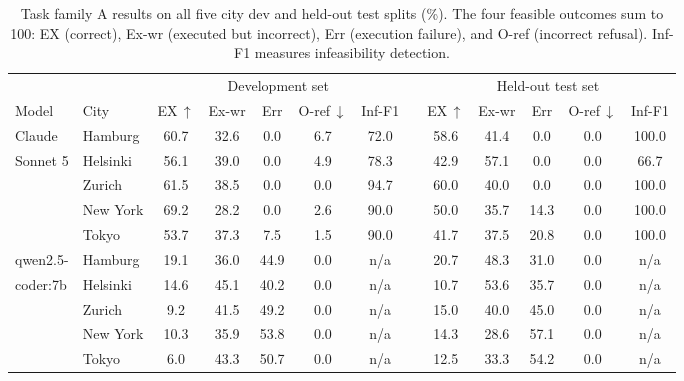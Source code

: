 \documentclass[sigconf,authordraft]{acmart}
\begin{document}
\begin{table}[ht!]
  \caption{
  Task family A results on all five city dev and held-out test splits (\%). The four feasible outcomes sum to 100: EX (correct), Ex-wr (executed but incorrect), Err (execution failure), and O-ref (incorrect refusal). Inf-F1 measures infeasibility detection. 
  }
  \label{tab:results_query}
  \setlength{\tabcolsep}{4pt}
  \begin{tabular}{ll ccccc c ccccc}
    \toprule
    & & \multicolumn{5}{c}{Development set} & & \multicolumn{5}{c}{Held-out test set} \\
    \cmidrule(lr){3-7}\cmidrule(lr){9-13}
    Model & City & EX\,$\uparrow$ & Ex-wr & Err & O-ref\,$\downarrow$ & Inf-F1 & & EX\,$\uparrow$ & Ex-wr & Err & O-ref\,$\downarrow$ & Inf-F1 \\
    \midrule
    Claude   & Hamburg  & 60.7 & 32.6 &  0.0 & 6.7 & 72.0 & & 58.6 & 41.4 &  0.0 & 0.0 & 100.0 \\
    Sonnet 5 & Helsinki & 56.1 & 39.0 &  0.0 & 4.9 & 78.3 & & 42.9 & 57.1 &  0.0 & 0.0 &  66.7 \\
             & Zurich   & 61.5 & 38.5 &  0.0 & 0.0 & 94.7 & & 60.0 & 40.0 &  0.0 & 0.0 & 100.0 \\
             & New York & 69.2 & 28.2 &  0.0 & 2.6 & 90.0 & & 50.0 & 35.7 & 14.3 & 0.0 & 100.0 \\
             & Tokyo    & 53.7 & 37.3 &  7.5 & 1.5 & 90.0 & & 41.7 & 37.5 & 20.8 & 0.0 & 100.0 \\
    \addlinespace
    qwen2.5- & Hamburg  & 19.1 & 36.0 & 44.9 & 0.0 & n/a & & 20.7 & 48.3 & 31.0 & 0.0 & n/a \\
    coder:7b & Helsinki & 14.6 & 45.1 & 40.2 & 0.0 & n/a & & 10.7 & 53.6 & 35.7 & 0.0 & n/a \\
             & Zurich   &  9.2 & 41.5 & 49.2 & 0.0 & n/a & & 15.0 & 40.0 & 45.0 & 0.0 & n/a \\
             & New York & 10.3 & 35.9 & 53.8 & 0.0 & n/a & & 14.3 & 28.6 & 57.1 & 0.0 & n/a \\
             & Tokyo    &  6.0 & 43.3 & 50.7 & 0.0 & n/a & & 12.5 & 33.3 & 54.2 & 0.0 & n/a \\
    \bottomrule
  \end{tabular}


\end{table}
\end{document}
